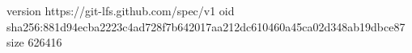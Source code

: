 version https://git-lfs.github.com/spec/v1
oid sha256:881d94ecba2223c4ad728f7b642017aa212dc610460a45ca02d348ab19dbce87
size 626416

